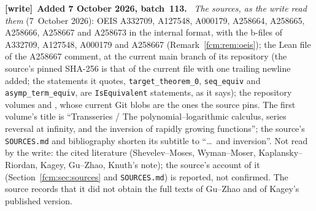 \documentclass[11pt,letterpaper]{article}
\theoremstyle{remark}\newtheorem{remark}[theorem]{Remark}
\newcommand{\file}[1]{\nolinkurl{#1}}
\newenvironment{writenote}[1][]{\par\smallskip\begingroup\small
 \noindent\textbf{[write]}\if\relax\detokenize{#1}\relax\else~\textbf{#1.}\fi\ }%
 {\par\endgroup\smallskip}
\begin{document}
\begin{writenote}[Added 7 October 2026, batch~113]
\emph{The sources, as the write read them} (7~October 2026): OEIS A332709,
A127548, A000179, A258664, A258665, A258666, A258667 and A258673 in the
internal format, with the b-files of A332709, A127548, A000179 and A258667
(Remark~\ref{fcm:rem:oeis}); the Lean file of the A258667 comment, at the
current main branch of its repository (the source's pinned SHA-256 is that of
the current file with one trailing newline added; the statements it quotes,
\texttt{target\_theorem\_0}, \texttt{seq\_equiv} and \texttt{asymp\_term\_equiv},
are \texttt{IsEquivalent} statements, as it says); the repository volumes
and ,
whose current Git blobs are the ones the source pins. The first volume's title
is ``Transseries / The polynomial--logarithmic calculus, series reversal at
infinity, and the inversion of rapidly growing functions''; the source's
\file{SOURCES.md} and bibliography shorten its subtitle to ``\dots\ and
inversion''. Not read by the write: the cited literature (Shevelev--Moses,
Wyman--Moser, Kaplansky--Riordan, Kagey, Gu--Zhao, Knuth's note); the
source's account of it (Section~\ref{fcm:sec:sources} and \file{SOURCES.md})
is reported, not confirmed. The source records that it did not obtain the full
texts of Gu--Zhao and of Kagey's published version.


\end{writenote}
\end{document}
